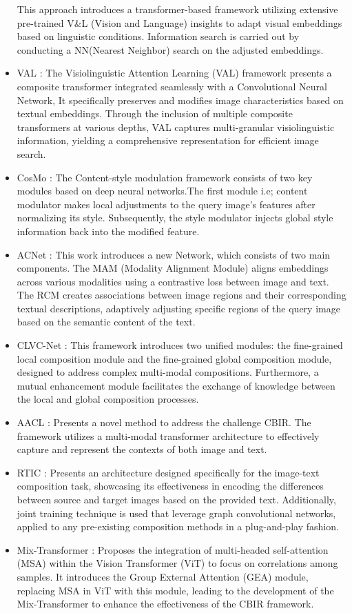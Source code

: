 \documentclass[10pt,lineno]{wlpeerj}
\begin{document}
\begin{itemize}
    This approach introduces a transformer-based framework utilizing extensive pre-trained V\&L (Vision and Language) insights to adapt visual embeddings based on linguistic conditions. Information search is carried out by conducting a NN(Nearest Neighbor) search on the adjusted embeddings.
    \item VAL \citep{VAL}: 
    The Visiolinguistic Attention Learning (VAL) framework presents a composite transformer integrated seamlessly with a Convolutional Neural Network, It specifically preserves and modifies image characteristics based on textual embeddings. Through the inclusion of multiple composite transformers at various depths, VAL captures multi-granular visiolinguistic information, yielding a comprehensive representation for efficient image search.
    \item CosMo \citep{CoSMo}: 
    The Content-style modulation framework consists of two key modules based on deep neural networks.The first module i.e; content modulator makes local adjustments to the query image's features after normalizing its style. Subsequently, the style modulator injects global style information back into the modified feature.
    \item ACNet \citep{ACNet}: 
This work introduces a new Network, which consists of two main components. The MAM (Modality Alignment Module) aligns embeddings across various modalities using a contrastive loss between image and text. The RCM creates associations between image regions and their corresponding textual descriptions, adaptively adjusting specific regions of the query image based on the semantic content of the text.
    \item CLVC-Net \citep{CLVCNet}: 
This framework introduces two unified modules: the fine-grained local composition module and the fine-grained global composition module, designed to address complex multi-modal compositions. Furthermore, a mutual enhancement module facilitates the exchange of knowledge between the local and global composition processes. 
   \item AACL \citep{AACL}:
Presents a novel method to address the challenge CBIR. The framework utilizes a multi-modal transformer architecture to effectively capture and represent the contexts of both image and text.
    
    \item RTIC \citep{RTIC}: Presents an architecture designed specifically for the image-text composition task, showcasing its effectiveness in encoding the differences between source and target images based on the provided text. Additionally, joint training technique is used that leverage graph convolutional networks, applied to any pre-existing composition methods in a plug-and-play fashion.
    \item Mix-Transformer \citep{Mix_Trans}: 
Proposes the integration of multi-headed self-attention (MSA) within the Vision Transformer (ViT) to focus on correlations among samples. It introduces the Group External Attention (GEA) module, replacing MSA in ViT with this module, leading to the development of the Mix-Transformer to enhance the effectiveness of the CBIR framework.


\end{itemize}
\end{document}
